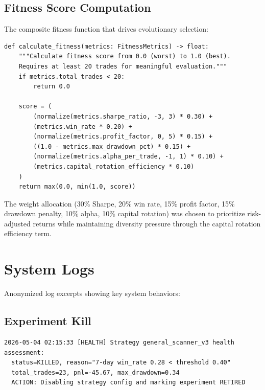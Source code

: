 \documentclass[11pt]{article}
\begin{document}
\subsection{Fitness Score Computation}

The composite fitness function that drives evolutionary selection:

\begin{lstlisting}[caption={Fitness calculation (domain/evolution/fitness.py)}]
def calculate_fitness(metrics: FitnessMetrics) -> float:
    """Calculate fitness score from 0.0 (worst) to 1.0 (best).
    Requires at least 20 trades for meaningful evaluation."""
    if metrics.total_trades < 20:
        return 0.0

    score = (
        (normalize(metrics.sharpe_ratio, -3, 3) * 0.30) +
        (metrics.win_rate * 0.20) +
        (normalize(metrics.profit_factor, 0, 5) * 0.15) +
        ((1.0 - metrics.max_drawdown_pct) * 0.15) +
        (normalize(metrics.alpha_per_trade, -1, 1) * 0.10) +
        (metrics.capital_rotation_efficiency * 0.10)
    )
    return max(0.0, min(1.0, score))
\end{lstlisting}

The weight allocation (30\% Sharpe, 20\% win rate, 15\% profit factor, 15\% drawdown penalty, 10\% alpha, 10\% capital rotation) was chosen to prioritize risk-adjusted returns while maintaining diversity pressure through the capital rotation efficiency term.


\section{System Logs}
\label{sec:logs}

Anonymized log excerpts showing key system behaviors:

\subsection{Experiment Kill}

\begin{lstlisting}[language={},caption={Strategy health kill event (AGI log, 2026-05-04)}]
2026-05-04 02:15:33 [HEALTH] Strategy general_scanner_v3 health assessment:
  status=KILLED, reason="7-day win_rate 0.28 < threshold 0.40"
  total_trades=23, pnl=-45.67, max_drawdown=0.34
  ACTION: Disabling strategy config and marking experiment RETIRED
\end{lstlisting}
\end{document}
